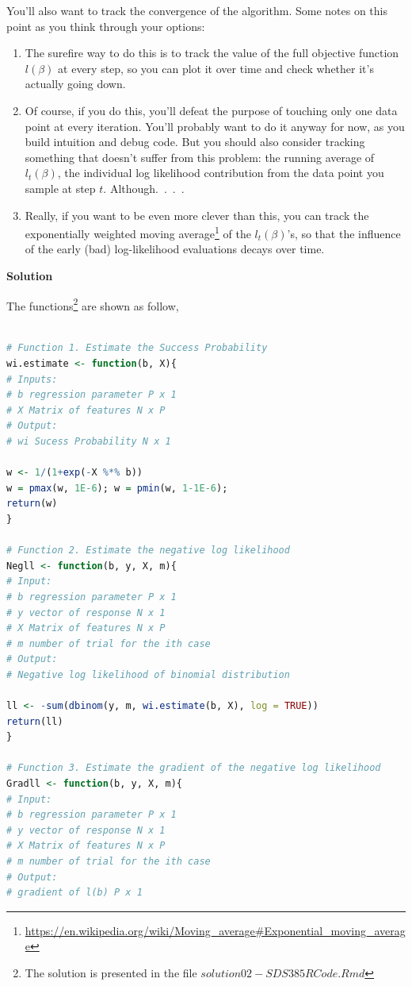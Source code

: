 \documentclass[11 pt]{article}
\begin{document}
\begin{enumerate}[label=(\Alph*)]
	
	You'll also want to track the convergence of the algorithm.  Some notes on this point as you think through your options:
	\begin{enumerate}[label=\arabic*.]
		\item The surefire way to do this is to track the value of the full objective function $l(\beta)$ at every step, so you can plot it over time and check whether it's actually going down.
		\item Of course, if you do this, you'll defeat the purpose of touching only one data point at every iteration.  You'll probably want to do it anyway for now, as you build intuition and debug code.  But you should also consider tracking something that doesn't suffer from this problem: the running average of $l_t(\beta)$, the individual log likelihood contribution from the data point you sample at step $t$.  Although.~.~.~.
		\item Really, if you want to be even more clever than this, you can track the exponentially weighted moving average\footnote{\url{https://en.wikipedia.org/wiki/Moving_average#Exponential_moving_average}} of the $l_t(\beta)$'s, so that the influence of the early (bad) log-likelihood evaluations decays over time. 
		
	\end{enumerate}
	\newpage
	\vspace{2mm}
	\textbf{Solution}
	
	The functions\footnote{The solution is presented in the file $solution02-SDS385RCode.Rmd$} are shown as follow,
	
	
	\begin{lstlisting}[language=R]
	
# Function 1. Estimate the Success Probability
wi.estimate <- function(b, X){
# Inputs:
# b regression parameter P x 1
# X Matrix of features N x P
# Output:
# wi Sucess Probability N x 1

w <- 1/(1+exp(-X %*% b)) 
w = pmax(w, 1E-6); w = pmin(w, 1-1E-6); 
return(w)
}

# Function 2. Estimate the negative log likelihood
Negll <- function(b, y, X, m){
# Input:
# b regression parameter P x 1
# y vector of response N x 1
# X Matrix of features N x P
# m number of trial for the ith case
# Output:
# Negative log likelihood of binomial distribution

ll <- -sum(dbinom(y, m, wi.estimate(b, X), log = TRUE))
return(ll)
}

# Function 3. Estimate the gradient of the negative log likelihood
Gradll <- function(b, y, X, m){
# Input:
# b regression parameter P x 1
# y vector of response N x 1
# X Matrix of features N x P
# m number of trial for the ith case
# Output:
# gradient of l(b) P x 1


\end{lstlisting}
\end{enumerate}
\end{document}
